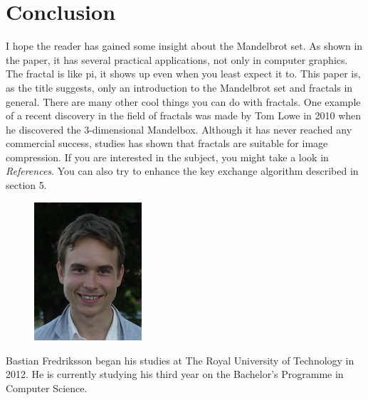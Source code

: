 \documentclass{article}
\begin{document}
\section{Conclusion}
I hope the reader has gained some insight about the Mandelbrot set. As shown in the paper, it has several practical applications, not only in computer graphics. The fractal is like pi, it shows up even when you least expect it to. This paper is, as the title suggests, only an introduction to the Mandelbrot set and fractals in general. There are many other cool things you can do with fractals. One example of a recent discovery in the field of fractals was made by Tom Lowe in 2010 when he discovered the 3-dimensional Mandelbox. Although it has never reached any commercial success, studies has shown that fractals are suitable for image compression. If you are interested in the subject, you might take a look in \textit{References}. You can also try to enhance the key exchange algorithm described in section 5.

\newpage



\begin{figure}[ht!]
\includegraphics[width=40mm]{bastian.jpg}
\end{figure}
\noindent
Bastian Fredriksson began his studies at The Royal University of Technology in 2012. He is currently studying his third year on the Bachelor's Programme in Computer Science.
\end{document}
